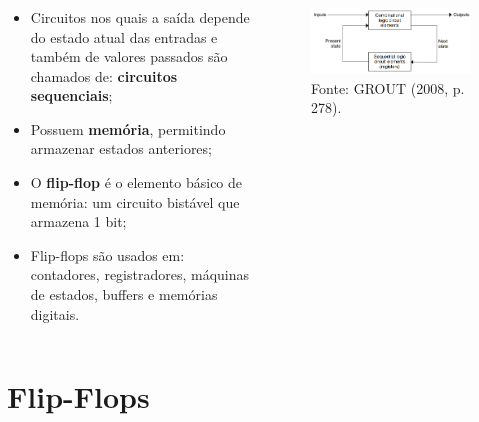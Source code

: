 \documentclass{beamer}
\begin{document}
\begin{frame}
    \frametitle{\insertsection}
    \begin{columns}
        \scriptsize

        \begin{column}[t]{0.38\textwidth}
            \begin{itemize}\scriptsize
                \item Circuitos nos quais a saída depende do estado atual das entradas e também de valores passados são chamados de: \textbf{circuitos sequenciais};
                \item Possuem \textbf{memória}, permitindo armazenar estados anteriores;
                \item O \textbf{flip-flop} é o elemento básico de memória: um circuito bistável que armazena 1 bit;
                \item Flip-flops são usados em: contadores, registradores, máquinas de estados, buffers e memórias digitais.
            \end{itemize}
        \end{column}
        
        \begin{column}[t]{0.58\textwidth}
            \begin{figure}
                \includegraphics[width=\columnwidth]{figures/sequential_circuit.png}
                \caption*{\tiny Fonte: GROUT (2008, p. 278).}
            \end{figure}
        \end{column}   
        
    \end{columns}
\end{frame}

\section{Flip-Flops}
\end{document}
